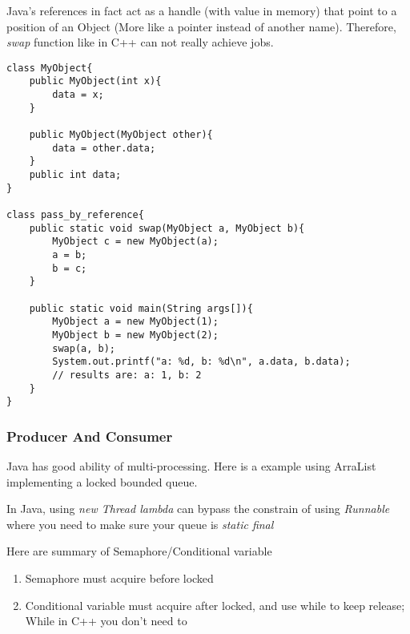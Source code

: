 Java's references in fact act as a handle (with value in memory) that point to a position of an Object (More like a pointer instead of another name). Therefore, \textit{swap} function like in C++ can not really achieve jobs.

\begin{lstlisting}
class MyObject{
    public MyObject(int x){
        data = x;
    }

    public MyObject(MyObject other){
        data = other.data;
    }
    public int data;
}

class pass_by_reference{
    public static void swap(MyObject a, MyObject b){
        MyObject c = new MyObject(a);
        a = b;
        b = c;
    }

    public static void main(String args[]){
        MyObject a = new MyObject(1);
        MyObject b = new MyObject(2);
        swap(a, b);
        System.out.printf("a: %d, b: %d\n", a.data, b.data);
        // results are: a: 1, b: 2
    }
}
\end{lstlisting}

\subsubsection{Producer And Consumer}
Java has good ability of multi-processing. Here is a example using ArraList implementing a locked bounded queue.

In Java, {\color{blue} using \textit{new Thread lambda} can bypass the constrain of using \textit{Runnable} where you need to make sure your queue is \textit{static final}}

Here are summary of Semaphore/Conditional variable
\begin{enumerate}
\item Semaphore must acquire before locked
\item Conditional variable must acquire after locked, and use while to keep release; While in C++ you don't need to
\end{enumerate}

